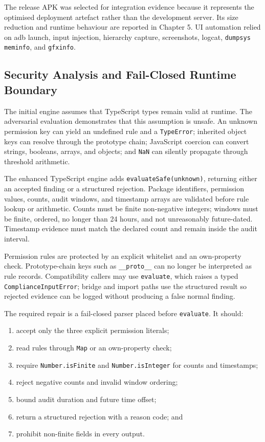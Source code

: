 The release APK was selected for integration evidence because it represents the optimised deployment artefact rather than the development server. Its size reduction and runtime behaviour are reported in Chapter 5. UI automation relied on adb launch, input injection, hierarchy capture, screenshots, logcat, \texttt{dumpsys meminfo}, and \texttt{gfxinfo}.

\subsection{Security Analysis and Fail-Closed Runtime Boundary}

The initial engine assumes that TypeScript types remain valid at runtime. The adversarial evaluation demonstrates that this assumption is unsafe. An unknown permission key can yield an undefined rule and a \texttt{TypeError}; inherited object keys can resolve through the prototype chain; JavaScript coercion can convert strings, booleans, arrays, and objects; and \texttt{NaN} can silently propagate through threshold arithmetic.

The enhanced TypeScript engine adds \texttt{evaluateSafe(unknown)}, returning either an accepted finding or a structured rejection. Package identifiers, permission values, counts, audit windows, and timestamp arrays are validated before rule lookup or arithmetic. Counts must be finite non-negative integers; windows must be finite, ordered, no longer than 24 hours, and not unreasonably future-dated. Timestamp evidence must match the declared count and remain inside the audit interval.

Permission rules are protected by an explicit whitelist and an own-property check. Prototype-chain keys such as \texttt{\_\_proto\_\_} can no longer be interpreted as rule records. Compatibility callers may use \texttt{evaluate}, which raises a typed \texttt{ComplianceInputError}; bridge and import paths use the structured result so rejected evidence can be logged without producing a false normal finding.

The required repair is a fail-closed parser placed before \texttt{evaluate}. It should:

\begin{enumerate}
    \item accept only the three explicit permission literals;
    \item read rules through \texttt{Map} or an own-property check;
    \item require \texttt{Number.isFinite} and \texttt{Number.isInteger} for counts and timestamps;
    \item reject negative counts and invalid window ordering;
    \item bound audit duration and future time offset;
    \item return a structured rejection with a reason code; and
    \item prohibit non-finite fields in every output.
\end{enumerate}

